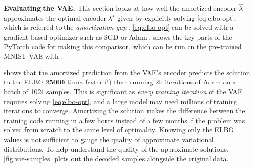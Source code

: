 \textbf{Evaluating the VAE.}
This section looks at how well the amortized encoder
$\hat\lambda$ approximates the optimal
encoder $\lambda^\star$ given by explicitly solving
\cref{eq:elbo-opt}, which is
referred to the \emph{amortization gap} \citep{cremer2018inference}.
\cref{eq:elbo-opt} can be solved with a gradient-based optimizer
such as SGD or Adam \citep{kingma2014adam}.
 shows the key parts of the PyTorch code
for making this comparison, which can be run on the pre-trained
MNIST VAE with
.

 shows that the amortized prediction from
the VAE's encoder predicts the solution to the ELBO \textbf{25000}
times faster (!) than running 2k iterations of Adam on
a batch of 1024 samples.
This is significant as \emph{every training iteration} of
the VAE requires solving \cref{eq:elbo-opt}, and a large model
may need millions of training iterations to converge.
Amortizing the solution makes the difference between the training
code running in a few hours instead of a few months if
the problem was solved from scratch to the same level of optimality.
Knowing only the ELBO values is not sufficient to gauge
the quality of approximate variational distributions.
To help understand the quality of the approximate solutions,
\cref{fig:vae-samples} plots out the decoded samples
alongside the original data.

